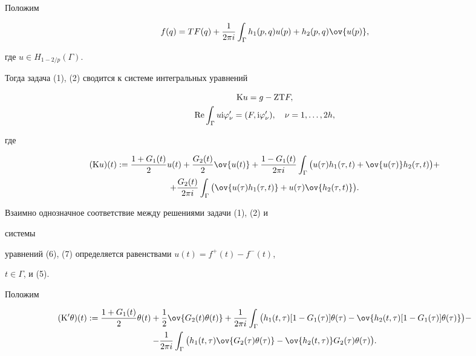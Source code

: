 Положим 


\begin{equation} 


f(q)=T F (q)+\frac{1}{2\pi i}\int_\Gamma h_1(p,q)u(p)+ 


h_2(p,q)\ov{u(p)}, 


\end{equation} 


где $u\in H_{1-2/p}(\Gamma)$. 


Тогда задача (1), (2) сводится к системе интегральных уравнений 


\begin{gather} 


{\mathrm K}u=g-{\mathrm Z}{\mathrm T}F,\\ 


\re\int_\Gamma u{\mathrm i\varphi'_\nu}= 


(F,{\mathrm i}\varphi'_\nu),\quad \nu=1,\dotsc,2h, 


\end{gather} 


где 


\begin{multline*} 


({\mathrm K}u)(t):=\frac{1+G_1(t)}{2}u(t)+ 


\frac{G_2(t)}{2}\ov{u(t)}+\frac{1-G_1(t)}{2\pi i}\int_\Gamma 


\big(u(\tau)h_1(\tau,t)+\ov{u(\tau)}h_2(\tau,t)\big)+ \\ 


% 


+\frac{G_2(t)}{2\pi i}\int_\Gamma\big(\ov{u(\tau)h_1(\tau,t)}+ 


u(\tau)\ov{h_2(\tau,t)}\big). 


\end{multline*} 


 


Взаимно однозначное соответствие между решениями задачи (1), (2) и 


системы 


уравнений (6), (7) определяется равенствами $u(t)=f^+(t)-f^-(t)$, 


$t\in\Gamma$, и (5). 


 


Положим 


\begin{multline*} 


({\mathrm K}'\theta)(t):=\frac{1+G_1(t)}{2}\theta(t)+\frac{1}{2} 


\ov{G_2(t)\theta(t)}+\frac{1}{2\pi i}\int_\Gamma 


\big(h_1(t,\tau)[1-G_1(\tau)]\theta(\tau)- 


\ov{h_2(t,\tau)[1-G_1(\tau)]\theta(\tau)}\big) - \\ 


% 


-\frac{1}{2\pi i}\int_\Gamma\big(h_1(t,\tau) 


\ov{G_2(\tau)\theta(\tau)}-\ov{h_2(t,\tau)}G_2(\tau)\theta(\tau)\big). 


\end{multline*} 


